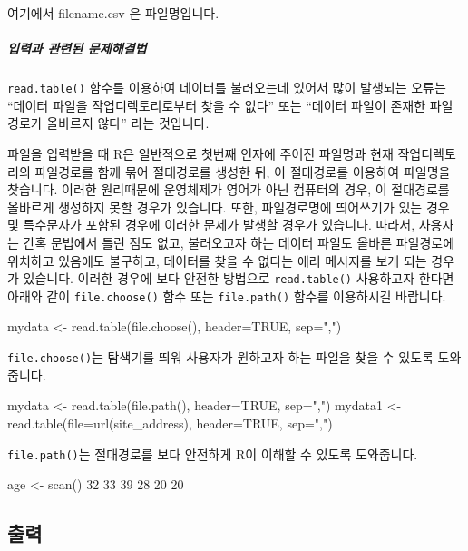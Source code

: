 \documentclass{book}
\begin{document}
여기에서 filename.csv 은 파일명입니다.

\subparagraph{입력과 관련된 문제해결법}

\texttt{read.table()} 함수를 이용하여 데이터를 불러오는데 있어서 많이 발생되는 오류는 ``데이터 파일을 작업디렉토리로부터 찾을 수 없다'' 또는 ``데이터 파일이 존재한 파일경로가 올바르지 않다'' 라는 것입니다. 

파일을 입력받을 때 R은 일반적으로 첫번째 인자에 주어진 파일명과 현재 작업디렉토리의 파일경로를 함께 묶어 절대경로를 생성한 뒤, 이 절대경로를 이용하여 파일명을 찾습니다. 
이러한 원리때문에 운영체제가 영어가 아닌 컴퓨터의 경우, 이 절대경로를 올바르게 생성하지 못할 경우가 있습니다. 
또한, 파일경로명에 띄어쓰기가 있는 경우 및 특수문자가 포함된 경우에 이러한 문제가 발생할 경우가 있습니다. 
따라서, 사용자는 간혹 문법에서 틀린 점도 없고, 불러오고자 하는 데이터 파일도 올바른 파일경로에 위치하고 있음에도 불구하고, 데이터를 찾을 수 없다는 에러 메시지를 보게 되는 경우가 있습니다. 
이러한 경우에 보다 안전한 방법으로 \texttt{read.table()} 사용하고자 한다면 아래와 같이 \texttt{file.choose()} 함수 또는 \texttt{file.path()} 함수를 이용하시길 바랍니다.

\begin{Schunk}
\begin{Soutput}
mydata <- read.table(file.choose(), header=TRUE, sep=",")
\end{Soutput}
\end{Schunk}

\texttt{file.choose()}는 탐색기를 띄워 사용자가 원하고자 하는 파일을 찾을 수 있도록 도와줍니다. 

\begin{Schunk}
\begin{Soutput}
mydata <- read.table(file.path(), header=TRUE, sep=",")
mydata1 <- read.table(file=url(site_address), header=TRUE, sep=",")
\end{Soutput}
\end{Schunk}

\texttt{file.path()}는 절대경로를 보다 안전하게 R이 이해할 수 있도록 도와줍니다. 



\begin{Schunk}
\begin{Soutput}
age <- scan()
32 33 39 28 20 20

\end{Soutput}
\end{Schunk}


\subsection{출력}
\end{document}
